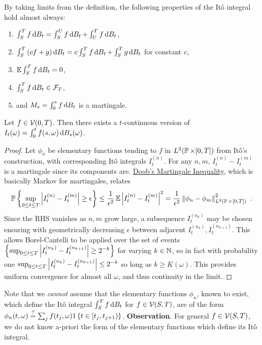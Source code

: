 \documentclass{article}
\begin{document}
By taking limits from the definition, the following properties of the It\^{o} integral hold almost always:

\begin{enumerate}
\item \(\int_S^Tf\d{B_t}=\int_S^Uf\d{B_t}+\int_U^Tf\d{B_t}\),
\item \(\int_S^T \pa{cf+g}\d{B_t}=c\int_S^Tf\d{B_t}+\int_S^Tg\d{B_t}\) for constant \(c\),
\item \(\E \int_S^Tf\d{B_t} =0\),
\item \(\int_S^Tf\d{B_t} \in\mcF_T\),
\item and \(M_s=\int_0^s f\d{B_t}\) is a martingale.
\end{enumerate}

\begin{theorem}
  Let \(f\in\mcV(0, T)\). Then there exists a \(t\)-continuous version of \(I_t(\omega)=\int_0^tf(s, \omega)\d{B_s(\omega)}\).
\end{theorem}
\begin{proof}
  Let \(\phi_n\) be elementary functions tending to \(f\) in \(L^2(\P \times [0, T])\) from It\^{o}'s construction, with corresponding It\^{o} integrals \(I_t^{(n)}\). For any \(n,m\), \(I_t^{(n)}-I_t^{(m)}\) is a martingale since its components are. \href{https://math.ucsd.edu/~pfitz/downloads/courses/winter05/math280b/doob.pdf}{Doob's Martingale Inequality}, which is basically Markov for martingales, relates
  \[
    \P\ca{\sup_{0\le t\le T}\abs{I_t^{(n)}-I_t^{(m)}}\ge \epsilon}\le\frac{1}{\epsilon^2}\E\abs{I_t^{(n)}-I_t^{(m)}}^2=\frac{1}{\epsilon^2}\norm{\phi_n-\phi_m}_{L^2(\P\times[0,T])}^2\,\,.
  \]
  Since the RHS vanishes as \(n,m\) grow large, a subsequence \(I_t^{(n_k)}\) may be chosen ensuring with geometrically decreasing \(\epsilon\) between adjacent \(I_t^{(n_k)},I_t^{(n_{k+1})}\). This allows Borel-Cantelli to be applied over the set of events \(\ca{\sup_{0\le t\le T}\abs{I_t^{(n_k)}-I_t^{(n_{k+1})}}\ge 2^{-k}}\) for varying \(k\in\N\), so in fact with probability one \(\sup_{0\le t\le T}\abs{I_t^{(n_k)}-I_t^{(n_{k+1})}}\le 2^{-k}\) so long as \(k\ge K(\omega)\). This provides uniform convergence for almost all \(\omega\), and thus continuity in the limit.
\end{proof}

Note that we {\em cannot} assume that the elementary functions \(\phi_n\), known to exist, which define the It\^{o} integral \(\int_S^T f\d{B_t}\) for \(f\in \mcV(S,T)\), are of the form \(\phi_n(t, \omega)\stackrel{?}{=}\sum_jf(t_j,\omega)1\ca{t\in[t_j,t_{j+1})}\). \textbf{Observation}. For general \(f\in\mcV(S,T)\), we do not know a-priori the form of the elementary functions which define its It\^{o} integral.
\end{document}
